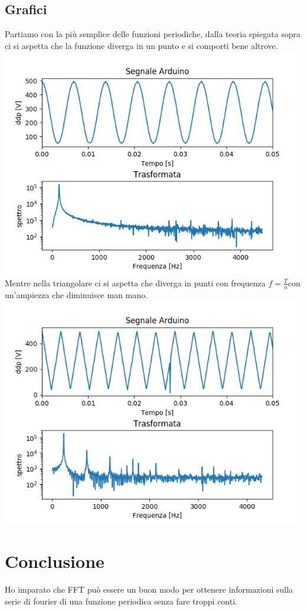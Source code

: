 \documentclass[11pt,a4paper]{article}
\begin{document}
	\subsection{Grafici}
	Partiamo con la più semplice delle funzioni periodiche, dalla teoria spiegata sopra ci si aspetta che la funzione diverga in un punto e si comporti bene altrove.\\
	\includegraphics[width=\textwidth]{grafici/Sinusoidelunga.png}
	Mentre nella triangolare ci si aspetta che diverga in punti con frequenza $f=\frac{T}{n}$con un'ampiezza che diminuisce man mano.\\
	\includegraphics[width=\textwidth]{grafici/triangolarelunga.png}

\section{Conclusione}
	Ho imparato che FFT può essere un buon modo per ottenere informazioni sulla serie di fourier di una funzione periodica senza fare troppi conti.
\end{document}
